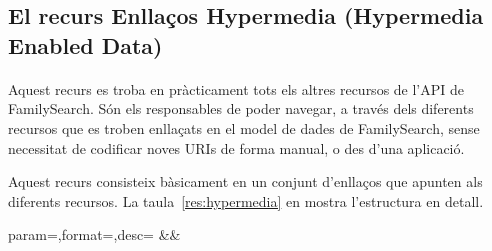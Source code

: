 \subsection{El recurs Enllaços Hypermedia (Hypermedia Enabled Data)}

    \paragraph{}
    Aquest recurs es troba en pràcticament tots els altres recursos de l'API de FamilySearch. Són els responsables de poder navegar, a través dels diferents recursos que es troben enllaçats en el model de dades de FamilySearch, sense necessitat de codificar noves URIs de forma manual, o des d'una aplicació.

    Aquest recurs consisteix bàsicament en un conjunt d'enllaços que apunten als diferents recursos. La taula~\ref{res:hypermedia} en mostra l'estructura en detall.

    \begin{center}
             {param=\param,format=\format,desc=\desc}
             {\param&\format&\desc}
     \end{center}
